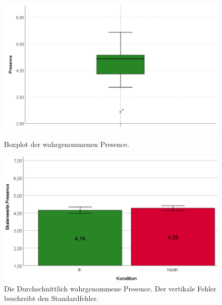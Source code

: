 \documentclass[a4paper,11pt]{article}%
\renewcommand{\\}{\vspace*{0.5\baselineskip} \newline}
\begin{document}
\begin{figure}[H]
   \begin{minipage}[t]{.5\linewidth} %
      \includegraphics[width=\linewidth]{Abbildungen/AuswertungDiagramme/BP_Presence.png}
      \caption[Boxplot der wahrgenommenen Presence]{Boxplot der wahrgenommenen Presence.}
      \label{SD_PresenceBP}
   \end{minipage}
   \hspace{.02\linewidth}%
   \begin{minipage}[t]{.5\linewidth} %
     \includegraphics[width=\linewidth]{Abbildungen/AuswertungDiagramme/SD_Presence_Mittelwerte.png}
      \caption[Durchschnittlich wahrgenommene Presence der Konditionen]{Die Durchschnittlich wahrgenommene Presence. Der vertikale Fehler beschreibt den Standardfehler.}
       \label{SD_Presence_Mittel}
   \end{minipage}
\end{figure}
\end{document}

